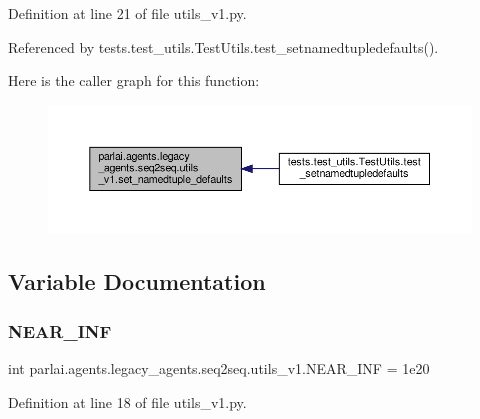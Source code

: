 Definition at line 21 of file utils\+\_\+v1.\+py.



Referenced by tests.\+test\+\_\+utils.\+Test\+Utils.\+test\+\_\+setnamedtupledefaults().

Here is the caller graph for this function\+:
\nopagebreak
\begin{figure}[H]
\begin{center}
\leavevmode
\includegraphics[width=350pt]{namespaceparlai_1_1agents_1_1legacy__agents_1_1seq2seq_1_1utils__v1_a17553492abb2e671bc3fc58e1e3a96b0_icgraph}
\end{center}
\end{figure}


\subsection{Variable Documentation}
\mbox{\label{namespaceparlai_1_1agents_1_1legacy__agents_1_1seq2seq_1_1utils__v1_ab1b867624df2a08ba94de6bd5a7acca4}} 
\subsubsection{\texorpdfstring{N\+E\+A\+R\+\_\+\+I\+NF}{NEAR\_INF}}
{\footnotesize\ttfamily int parlai.\+agents.\+legacy\+\_\+agents.\+seq2seq.\+utils\+\_\+v1.\+N\+E\+A\+R\+\_\+\+I\+NF = 1e20}



Definition at line 18 of file utils\+\_\+v1.\+py.

